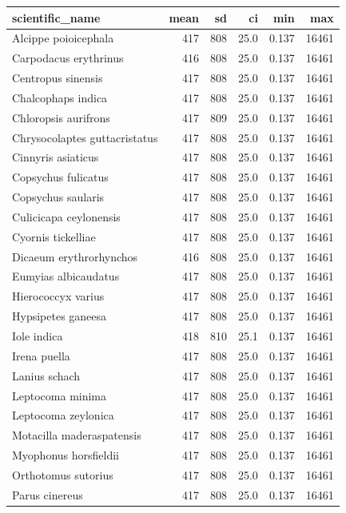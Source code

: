 \documentclass[]{article}
\begin{document}
\begin{tabular}{l|r|r|r|r|r}
\hline
scientific\_name & mean & sd & ci & min & max\\
\hline
Alcippe poioicephala & 417 & 808 & 25.0 & 0.137 & 16461\\
\hline
Carpodacus erythrinus & 416 & 808 & 25.0 & 0.137 & 16461\\
\hline
Centropus sinensis & 417 & 808 & 25.0 & 0.137 & 16461\\
\hline
Chalcophaps indica & 417 & 808 & 25.0 & 0.137 & 16461\\
\hline
Chloropsis aurifrons & 417 & 809 & 25.0 & 0.137 & 16461\\
\hline
Chrysocolaptes guttacristatus & 417 & 808 & 25.0 & 0.137 & 16461\\
\hline
Cinnyris asiaticus & 417 & 808 & 25.0 & 0.137 & 16461\\
\hline
Copsychus fulicatus & 417 & 808 & 25.0 & 0.137 & 16461\\
\hline
Copsychus saularis & 417 & 808 & 25.0 & 0.137 & 16461\\
\hline
Culicicapa ceylonensis & 417 & 808 & 25.0 & 0.137 & 16461\\
\hline
Cyornis tickelliae & 417 & 808 & 25.0 & 0.137 & 16461\\
\hline
Dicaeum erythrorhynchos & 416 & 808 & 25.0 & 0.137 & 16461\\
\hline
Eumyias albicaudatus & 417 & 808 & 25.0 & 0.137 & 16461\\
\hline
Hierococcyx varius & 417 & 808 & 25.0 & 0.137 & 16461\\
\hline
Hypsipetes ganeesa & 417 & 808 & 25.0 & 0.137 & 16461\\
\hline
Iole indica & 418 & 810 & 25.1 & 0.137 & 16461\\
\hline
Irena puella & 417 & 808 & 25.0 & 0.137 & 16461\\
\hline
Lanius schach & 417 & 808 & 25.0 & 0.137 & 16461\\
\hline
Leptocoma minima & 417 & 808 & 25.0 & 0.137 & 16461\\
\hline
Leptocoma zeylonica & 417 & 808 & 25.0 & 0.137 & 16461\\
\hline
Motacilla maderaspatensis & 417 & 808 & 25.0 & 0.137 & 16461\\
\hline
Myophonus horsfieldii & 417 & 808 & 25.0 & 0.137 & 16461\\
\hline
Orthotomus sutorius & 417 & 808 & 25.0 & 0.137 & 16461\\
\hline
Parus cinereus & 417 & 808 & 25.0 & 0.137 & 16461\\

\end{tabular}
\end{document}
